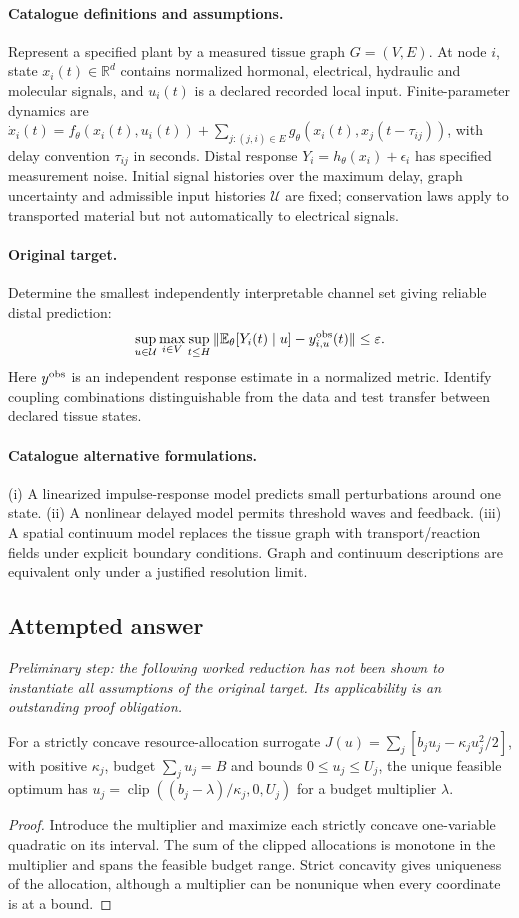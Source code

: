 \documentclass[11pt]{article}
\begin{document}
\paragraph{Catalogue definitions and assumptions.}
Represent a specified plant by a measured tissue graph $G=(V,E)$. At node $i$, state $x_i(t)\in\mathbb{R}^d$ contains normalized hormonal, electrical, hydraulic and molecular signals, and $u_i(t)$ is a declared recorded local input. Finite-parameter dynamics are $\dot x_i(t)=f_\theta(x_i(t),u_i(t))+\sum_{j:(j,i)\in E}g_\theta(x_i(t),x_j(t-\tau_{ij}))$, with delay convention $\tau_{ij}$ in seconds. Distal response $Y_i=h_\theta(x_i)+\epsilon_i$ has specified measurement noise. Initial signal histories over the maximum delay, graph uncertainty and admissible input histories $\mathcal U$ are fixed; conservation laws apply to transported material but not automatically to electrical signals.
\paragraph{Original target.}
Determine the smallest independently interpretable channel set giving reliable distal prediction:
    \[\sup_{u\in\mathcal U}\max_{i\in V}
    \sup_{t\leq H}\|\mathbb{E}_\theta[Y_i(t)\mid u]-y^{\rm obs}_{i,u}(t)\|\leq\varepsilon.\]
    Here $y^{\rm obs}$ is an independent response estimate in a normalized metric. Identify coupling combinations distinguishable from the data and test transfer between declared tissue states.
\paragraph{Catalogue alternative formulations.}
(i) A linearized impulse-response model predicts small perturbations around one state. (ii) A nonlinear delayed model permits threshold waves and feedback. (iii) A spatial continuum model replaces the tissue graph with transport/reaction fields under explicit boundary conditions. Graph and continuum descriptions are equivalent only under a justified resolution limit.
\subsection{Attempted answer}
\noindent\emph{Preliminary step: the following worked reduction has not been shown to instantiate all assumptions of the original target. Its applicability is an outstanding proof obligation.}

\begin{proposition}
For a strictly concave resource-allocation surrogate $J(u)=\sum_j[b_ju_j-\kappa_j u_j^2/2]$, with positive $\kappa_j$, budget $\sum_ju_j=B$ and bounds $0\leq u_j\leq U_j$, the unique feasible optimum has $u_j=\operatorname{clip}((b_j-\lambda)/\kappa_j,0,U_j)$ for a budget multiplier $\lambda$.
\end{proposition}
\begin{proof}
Introduce the multiplier and maximize each strictly concave one-variable quadratic on its interval. The sum of the clipped allocations is monotone in the multiplier and spans the feasible budget range. Strict concavity gives uniqueness of the allocation, although a multiplier can be nonunique when every coordinate is at a bound.
\end{proof}
\end{document}
